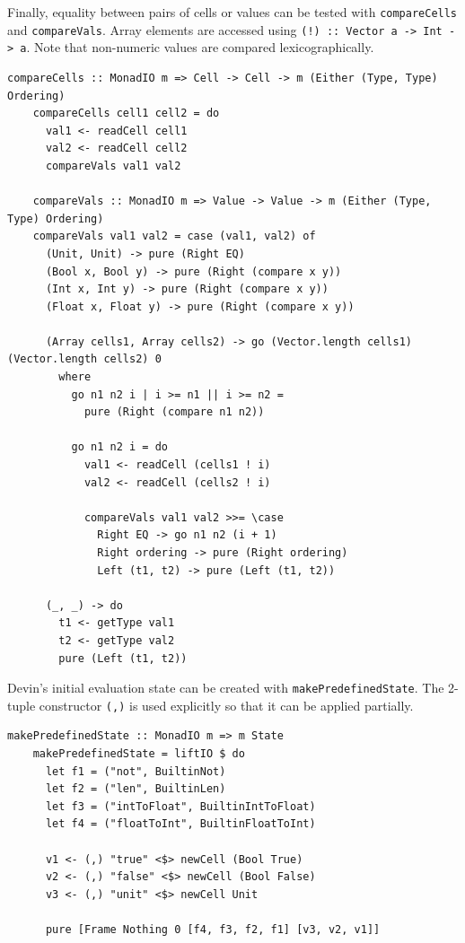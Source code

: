 \documentclass[UdineBachThesis,american,11pt]{PhdThesis}
\begin{document}
  \pagebreak

  Finally, equality between pairs of cells or values can be tested with
  \mbox{\texttt{compareCells}} and \mbox{\texttt{compareVals}}. Array elements
  are accessed using \mbox{\texttt{(!) :: Vector a -> Int -> a}}. Note that
  non-numeric values are compared lexicographically.

  \begin{Verbatim}[gobble=4,fontsize=\small]
    compareCells :: MonadIO m => Cell -> Cell -> m (Either (Type, Type) Ordering)
    compareCells cell1 cell2 = do
      val1 <- readCell cell1
      val2 <- readCell cell2
      compareVals val1 val2

    compareVals :: MonadIO m => Value -> Value -> m (Either (Type, Type) Ordering)
    compareVals val1 val2 = case (val1, val2) of
      (Unit, Unit) -> pure (Right EQ)
      (Bool x, Bool y) -> pure (Right (compare x y))
      (Int x, Int y) -> pure (Right (compare x y))
      (Float x, Float y) -> pure (Right (compare x y))

      (Array cells1, Array cells2) -> go (Vector.length cells1) (Vector.length cells2) 0
        where
          go n1 n2 i | i >= n1 || i >= n2 =
            pure (Right (compare n1 n2))

          go n1 n2 i = do
            val1 <- readCell (cells1 ! i)
            val2 <- readCell (cells2 ! i)

            compareVals val1 val2 >>= \case
              Right EQ -> go n1 n2 (i + 1)
              Right ordering -> pure (Right ordering)
              Left (t1, t2) -> pure (Left (t1, t2))

      (_, _) -> do
        t1 <- getType val1
        t2 <- getType val2
        pure (Left (t1, t2))
  \end{Verbatim}

  Devin's initial evaluation state can be created with
  \mbox{\texttt{makePredefinedState}}. The 2-tuple constructor
  \mbox{\texttt{(,)}} is used explicitly so that it can be applied partially.

  \begin{Verbatim}[gobble=4,fontsize=\small]
    makePredefinedState :: MonadIO m => m State
    makePredefinedState = liftIO $ do
      let f1 = ("not", BuiltinNot)
      let f2 = ("len", BuiltinLen)
      let f3 = ("intToFloat", BuiltinIntToFloat)
      let f4 = ("floatToInt", BuiltinFloatToInt)

      v1 <- (,) "true" <$> newCell (Bool True)
      v2 <- (,) "false" <$> newCell (Bool False)
      v3 <- (,) "unit" <$> newCell Unit

      pure [Frame Nothing 0 [f4, f3, f2, f1] [v3, v2, v1]]
  \end{Verbatim}
\end{document}
